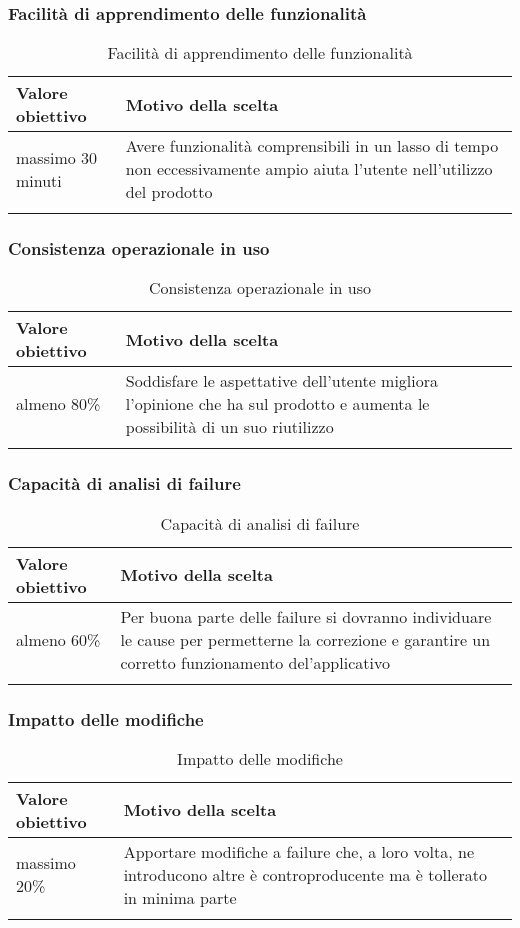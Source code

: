 \documentclass[../PianoDiQualifica.tex]{subfiles}
\begin{document}
		\subsubsection{Facilità di apprendimento delle funzionalità}
			\begin{longtable}[c] { >{\centering\arraybackslash}p{4cm} p{7cm} }
				\toprule
				\centerline{\textbf{Valore obiettivo}} & \centerline{\textbf{Motivo della scelta}} \\
				\midrule
					massimo 30 minuti & Avere funzionalità comprensibili in un lasso di tempo non eccessivamente ampio aiuta l'utente nell'utilizzo del prodotto \\
				\bottomrule
				\caption{Facilità di apprendimento delle funzionalità}
			\end{longtable}
			
		\subsubsection{Consistenza operazionale in uso}
			\begin{longtable}[c] { >{\centering\arraybackslash}p{4cm} p{7cm} }
				\toprule
				\centerline{\textbf{Valore obiettivo}} & \centerline{\textbf{Motivo della scelta}} \\
				\midrule
					almeno 80\% & Soddisfare le aspettative dell'utente migliora l'opinione che ha sul prodotto e aumenta le possibilità di un suo riutilizzo  \\
				\bottomrule
				\caption{Consistenza operazionale in uso}
			\end{longtable}
			
		\subsubsection{Capacità di analisi di failure}
			\begin{longtable}[c] { >{\centering\arraybackslash}p{4cm} p{7cm} }
				\toprule
				\centerline{\textbf{Valore obiettivo}} & \centerline{\textbf{Motivo della scelta}} \\
				\midrule
					almeno 60\% & Per buona parte delle failure si dovranno individuare le cause per permetterne la correzione e garantire un corretto funzionamento del'applicativo  \\
				\bottomrule
				\caption{Capacità di analisi di failure}
			\end{longtable}
			
		\subsubsection{Impatto delle modifiche}
			\begin{longtable}[c] { >{\centering\arraybackslash}p{4cm} p{7cm} }
				\toprule
				\centerline{\textbf{Valore obiettivo}} & \centerline{\textbf{Motivo della scelta}} \\
				\midrule
					massimo 20\% & Apportare modifiche a failure che, a loro volta, ne introducono altre è controproducente ma è tollerato in minima parte \\
				\bottomrule
				\caption{Impatto delle modifiche}
			\end{longtable}
			
\end{document}
